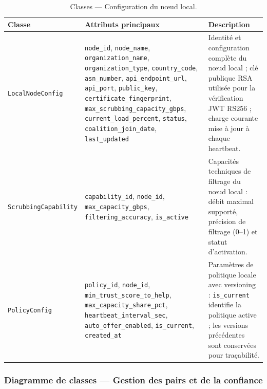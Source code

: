 \begin{table}[H]
\centering
\caption{Classes — Configuration du nœud local.}
\label{tab:classes_local}

\renewcommand{\arraystretch}{1.6}
\setlength{\tabcolsep}{5pt}

\begin{tabular}{|
>{\raggedright\arraybackslash}p{4.2cm}|
>{\raggedright\arraybackslash}p{6.0cm}|
>{\raggedright\arraybackslash}p{4.2cm}|}
\hline

\textbf{Classe} &
\textbf{Attributs principaux} &
\textbf{Description} \\
\hline

\texttt{LocalNodeConfig} &
\texttt{node\_id}, \texttt{node\_name}, \texttt{organization\_name}, \texttt{organization\_type}, \texttt{country\_code}, \texttt{asn\_number}, \texttt{api\_endpoint\_url}, \texttt{api\_port}, \texttt{public\_key}, \texttt{certificate\_fingerprint}, \texttt{max\_scrubbing\_capacity\_gbps}, \texttt{current\_load\_percent}, \texttt{status}, \texttt{coalition\_join\_date}, \texttt{last\_updated} &
Identité et configuration complète du nœud local ; clé publique RSA utilisée pour la vérification JWT RS256 ; charge courante mise à jour à chaque heartbeat. \\
\hline

\texttt{ScrubbingCapability} &
\texttt{capability\_id}, \texttt{node\_id}, \texttt{max\_capacity\_gbps}, \texttt{filtering\_accuracy}, \texttt{is\_active} &
Capacités techniques de filtrage du nœud local : débit maximal supporté, précision de filtrage (0--1) et statut d'activation. \\
\hline

\texttt{PolicyConfig} &
\texttt{policy\_id}, \texttt{node\_id}, \texttt{min\_trust\_score\_to\_help}, \texttt{max\_capacity\_share\_pct}, \texttt{heartbeat\_interval\_sec}, \texttt{auto\_offer\_enabled}, \texttt{is\_current}, \texttt{created\_at} &
Paramètres de politique locale avec versioning : \texttt{is\_current} identifie la politique active ; les versions précédentes sont conservées pour traçabilité. \\
\hline

\end{tabular}

\end{table}



\FloatBarrier
\subsubsection{Diagramme de classes — Gestion des pairs et de la confiance}

